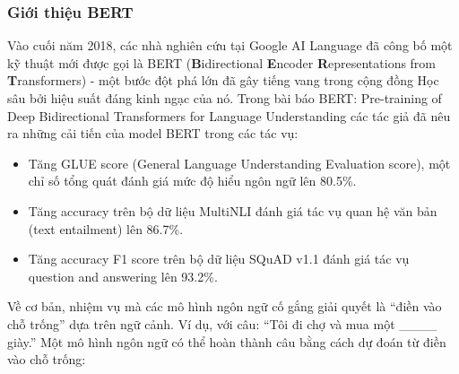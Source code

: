 

\subsubsection{Giới thiệu BERT}
Vào cuối năm 2018, các nhà nghiên cứu tại Google AI Language đã công bố một kỹ thuật mới được gọi là BERT ({\bf B}idirectional {\bf E}ncoder {\bf R}epresentations from {\bf T}ransformers) - một bước đột phá lớn đã gây tiếng vang trong cộng đồng Học sâu bởi hiệu suất đáng kinh ngạc của nó. Trong bài báo BERT: Pre-training of Deep Bidirectional Transformers for Language Understanding\cite{bert} các tác giả đã nêu ra những cải tiến của model BERT trong các tác vụ\cite{webpage20}:

\begin{itemize}
    \item Tăng GLUE score (General Language Understanding Evaluation score), một chỉ số tổng quát đánh giá mức độ hiểu ngôn ngữ lên 80.5\%.
    \item Tăng accuracy trên bộ dữ liệu MultiNLI đánh giá tác vụ quan hệ văn bản (text entailment) lên 86.7\%.
    \item Tăng accuracy F1 score trên bộ dữ liệu SQuAD v1.1 đánh giá tác vụ question and answering lên 93.2\%.
\end{itemize}
Về cơ bản, nhiệm vụ mà các mô hình ngôn ngữ cố gắng giải quyết là  ``điền vào chỗ trống'' dựa trên ngữ cảnh. Ví dụ, với câu: ``Tôi đi chợ và mua một \_\_\_\_ giày.''
Một mô hình ngôn ngữ có thể hoàn thành câu bằng cách dự đoán từ điền vào chỗ trống\cite{webpage19}:


